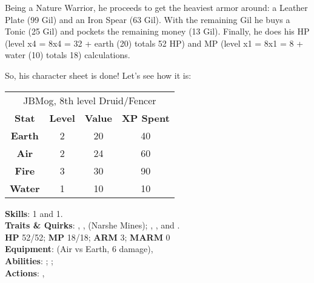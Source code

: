 \begin{multimog}
Being a Nature Warrior, he proceeds to get the heaviest armor around: a Leather Plate (99 Gil) and an Iron Spear (63 Gil). With the remaining Gil he buys a Tonic (25 Gil) and pockets the remaining money (13 Gil). Finally, he does his HP (level x4 = 8x4 = 32 + earth (20) totals 52 HP) and MP (level x1 = 8x1 = 8 + water (10) totals 18) calculations.

So, his character sheet is done! Let's see how it is:
\begin{center}\label{tab:jbmog}
  \begin{tabular}{cccc}
    \toprule
    \multicolumn{4}{c}{JBMog, 8th level Druid/Fencer} \\
    \textbf{Stat}  & \textbf{Level} & \textbf{Value} & \textbf{XP Spent} \\ \midrule
    \textbf{Earth} & 2              & 20             & 40                \\
    \textbf{Air}   & 2              & 24             & 60                \\
    \textbf{Fire}  & 3              & 30             & 90                \\
    \textbf{Water} & 1              & 10             & 10                \\ \bottomrule
  \end{tabular}
\end{center}

\noindent \textbf{Skills}:  1 and  1.\\
\textbf{Traits \& Quirks}: , ,  (Narshe Mines); , , and .\\
\textbf{HP} 52/52; \textbf{MP} 18/18; \textbf{ARM} 3; \textbf{MARM} 0\\
\textbf{Equipment}:  (Air vs Earth, 6 damage), \\
\textbf{Abilities}: ; ; \\
\textbf{Actions}: , 
\end{multimog}